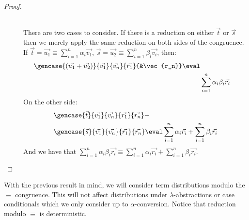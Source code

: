 \begin{proof}
\begin{description}
  \item[\parbox{\linewidth}{$\gencase{(\vec{t}+\vec{s})}{\vec{v}}{\vec{w}}{\vec{r_1}}{\vec{r_n}}\equiv\\ \gencase{\vec{t}}{\vec{v_1}}{\vec{v_n}}{\vec{r_1}}{\vec{r_n}}+\\
  \gencase{\vec{s}}{\vec{v_1}}{\vec{v_n}}{\vec{r_1}}{\vec{r_n}}$:}] \hfill\\
  
  There are two cases to consider. If there is a reduction on either $\vec{t}$ or $\vec{s}$ then we merely apply the same reduction on both sides of the congruence. If $\vec{t}=\vec{u_1}\equiv \sum_{i=1}^{n}\alpha_i \vec{v_1}$, $\vec{s}=\vec{u_2}\equiv\sum_{i=1}^{n}\beta_i \vec{v_i}$, then:
  \begin{align*}
  \gencase{(\vec{u_1}+\vec{u_2})}{\vec{v_1}}{\vec{v_n}}{\vec{r_1}}{&\vec{r_n}}\eval\\
  &\sum_{i=1}^{n} \alpha_i \beta_i \vec{r_i}
  \end{align*}
  On the other side:
  \begin{align*}
    &\gencase{\vec{t}}{\vec{v_1}}{\vec{v_n}}{\vec{r_1}}{\vec{r_n}}+\\
    &\gencase{\vec{s}}{\vec{v_1}}{\vec{v_n}}{\vec{r_1}}{\vec{r_n}}\eval\sum_{i=1}^{n}\alpha_i\vec{r_i} + \sum_{i=1}^{n}\beta_i \vec{r_i}
  \end{align*}
  And we have that $\sum_{i=1}^{n} \alpha_i\beta_i\vec{r_i}\equiv\sum_{i=1}^{n}\alpha_i\vec{r_i} + \sum_{i=1}^{n}\beta_i \vec{r_i}$.
  \end{description}
  \fi
\end{proof}

\begin{convention}
  With the previous result in mind, we will consider term distributions modulo the $\equiv$ congruence. This will not affect distributions under $\lambda$-abstractions or case conditionals which we only consider up to $\alpha$-conversion. Notice that reduction modulo $\equiv$ is deterministic.
\end{convention}
